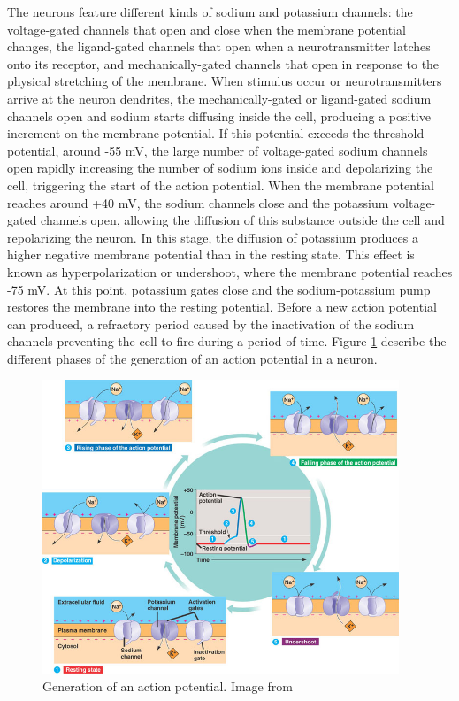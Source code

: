 The neurons feature different kinds of sodium and potassium channels: the voltage-gated channels that open and close when the membrane potential changes, the ligand-gated channels that open when a neurotransmitter latches onto its receptor, and  mechanically-gated channels that open in response to the physical stretching of the membrane. When stimulus occur or neurotransmitters arrive at the neuron dendrites, the mechanically-gated or ligand-gated sodium channels open and sodium starts diffusing inside the cell, producing a positive increment on the membrane potential. If this potential exceeds the threshold potential, around -55 mV, the large number of voltage-gated sodium channels open rapidly increasing the number of sodium ions inside and depolarizing the cell, triggering the start of the action potential. When the membrane potential reaches around +40 mV, the sodium channels close and the potassium voltage-gated channels open, allowing the diffusion of this substance outside the cell and repolarizing the neuron. In this stage, the diffusion of potassium produces a higher negative membrane potential than in the resting state. This effect is known as hyperpolarization or undershoot, where the membrane potential reaches -75 mV. At this point, potassium gates close and the sodium-potassium pump restores the membrane into the resting potential. Before a new action potential can produced, a refractory period caused by the inactivation of the sodium channels preventing the cell to fire during a period of time. Figure \ref{fig:actionpotential} describe the different phases of the generation of an action potential in a neuron. 

\begin{figure}[ht]
\centering
\includegraphics[width=0.95\textwidth]{Images/actionpotential.jpg}
\caption{Generation of an action potential. Image from \citet{Campbell2013}}
\label{fig:actionpotential}
\end{figure}

